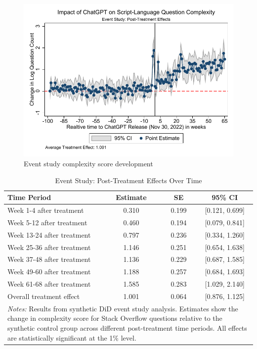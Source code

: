 \begin{figure}[H]
    \centering
    \includegraphics[width=1\linewidth]{imgs/stata/event_study_nlp.pdf}
    \caption{Event study complexity score development}
    \label{fig:cscore_event_study}
\end{figure}

\begin{table}[H]
    \centering
    \caption{Event Study: Post-Treatment Effects Over Time}
    \label{tab:csscore_event_study}
    \begin{tabular}{lccc}
    \toprule
    Time Period & Estimate & SE & 95\% CI \\
    \midrule
    Week 1-4 after treatment   & 0.310 & 0.199 & [0.121, 0.699] \\
    Week 5-12 after treatment  & 0.460 & 0.194 & [0.079, 0.841] \\
    Week 13-24 after treatment & 0.797 & 0.236 & [0.334, 1.260] \\
    Week 25-36 after treatment & 1.146 & 0.251 & [0.654, 1.638] \\
    Week 37-48 after treatment & 1.136 & 0.229 & [0.687, 1.585] \\
    Week 49-60 after treatment & 1.188 & 0.257 & [0.684, 1.693] \\
    Week 61-68 after treatment & 1.585 & 0.283 & [1.029, 2.140] \\
    \midrule
    Overall treatment effect & 1.001 & 0.064 & [0.876, 1.125] \\
    \bottomrule
    \multicolumn{4}{p{0.85\linewidth}}{\footnotesize \textit{Notes:} Results from synthetic DiD event study analysis. Estimates show the change in complexity score for Stack Overflow questions relative to the synthetic control group across different post-treatment time periods. All effects are statistically significant at the 1\% level.} \\
    \end{tabular}
\end{table}

